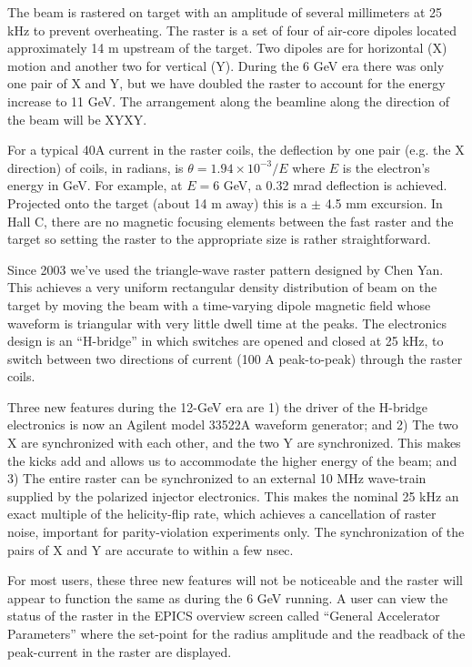 {{The beam is rastered on target with an amplitude of
several millimeters at 25 kHz to prevent overheating.  
The raster is a set of four of air-core dipoles located
approximately 14 m upstream of the target. 
Two dipoles are for horizontal (X) motion and
another two for vertical (Y).  During the 6 GeV era
there was only one pair of X and Y, but we have doubled
the raster to account for the energy increase to 11 GeV.
The arrangement along the beamline along the 
direction of the beam will be XYXY.

For a typical 40A current in the raster coils, the
deflection by one pair (e.g. the X direction) of coils, 
in radians, is $\theta = 1.94 \times 10^{-3}/ E$
where $E$ is the electron's energy in GeV.
For example, at $E = 6$ GeV, a 0.32 mrad deflection is achieved.
Projected onto the target (about 14 m away) this is a $\pm$ 4.5 mm
excursion. In Hall C, there are no magnetic focusing elements
between the fast raster and the target so setting the raster
to the appropriate size is rather straightforward.

Since 2003 we've used the triangle-wave 
raster pattern designed by Chen Yan.  
This achieves a very uniform rectangular
density distribution of beam on the target 
by moving the beam with a time-varying dipole
magnetic field whose waveform is triangular
with very little dwell time at the peaks.  
The electronics design is an ``H-bridge''
in which switches are opened and closed 
at 25 kHz, to switch between two directions 
of current (100 A peak-to-peak) 
through the raster coils.

Three new features during the 12-GeV era are 
1) the driver of the H-bridge electronics is now
an Agilent model 33522A waveform generator; and
2) The two X are synchronized with each other, and
the two Y are synchronized.  This makes the kicks
add and allows us to accommodate the higher energy
of the beam; and 3) The entire raster can
be synchronized to an external 10 MHz wave-train
supplied by the polarized injector electronics.
This makes the nominal 25 kHz an exact multiple of
the helicity-flip rate, which achieves a cancellation
of raster noise, important for parity-violation 
experiments only.
The synchronization of the pairs of X and Y are
accurate to within a few nsec.

For most users, these three new features will not be
noticeable and the raster will appear to function
the same as during the 6 GeV running.
A user can view the 
status of the raster in the
EPICS overview screen called ``General Accelerator
Parameters'' where the set-point for the radius amplitude
and the readback of the peak-current in the raster are displayed.

}}
